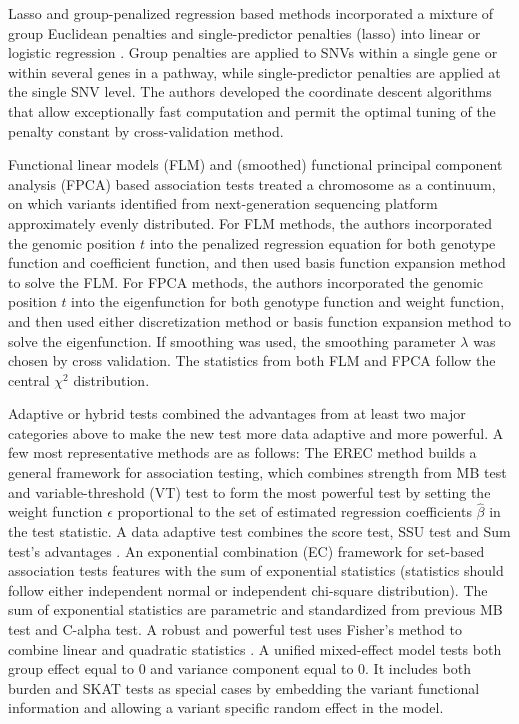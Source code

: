 \documentclass[12pt]{article}
\begin{document}
Lasso and group-penalized regression based methods incorporated a mixture of group Euclidean penalties and single-predictor penalties (lasso) into linear or logistic regression \cite{Zhou2010,Kim2014}. Group penalties are applied to SNVs within a single gene or within several genes in a pathway, while single-predictor penalties are applied at the single SNV level. The authors developed the coordinate descent algorithms that allow exceptionally fast computation and
permit the optimal tuning of the penalty constant by cross-validation method.

Functional linear models (FLM) and (smoothed) functional principal component analysis (FPCA) based association tests \cite{Luo2011,Luo2012, Luo2012a,Fan2013} treated a chromosome as a continuum, on which variants identified from next-generation sequencing platform approximately evenly distributed. For FLM methods, the authors incorporated the genomic position $t$ into the penalized regression equation for both genotype function and coefficient function, and then used basis function expansion method to solve the FLM. For FPCA methods, the authors incorporated the genomic position $t$ into the eigenfunction for both genotype function and weight function, and then used either discretization method or basis function expansion method to solve the eigenfunction. If smoothing was used, the smoothing parameter $\lambda$ was chosen by cross validation. The statistics from both FLM and FPCA follow the central $\chi^2$ distribution.

Adaptive or hybrid tests combined the advantages from at least two major categories above to make the new test more data adaptive and more powerful. A few most representative methods are as follows: The EREC method \cite{Lin2011} builds a general framework for association testing, which combines strength from MB test and variable-threshold (VT) test \cite{Price2010} to form the most powerful test by setting the weight function $\epsilon$ proportional to the set of estimated regression coefficients $\hat{\beta}$ in the test statistic. A data adaptive test combines the score test, SSU test and Sum test's advantages \cite{Pan2011}. An exponential combination (EC) framework for set-based association tests \cite{Chen2012} features with the sum of exponential statistics (statistics should follow either independent normal or independent chi-square distribution). The sum of exponential statistics are parametric and standardized from previous MB test and C-alpha test. A robust and powerful test uses Fisher's method to combine linear and quadratic statistics \cite{Derkach2013}. A unified mixed-effect model \cite{Sun2013} tests both group effect equal to 0 and variance component equal to 0. It includes both burden and SKAT tests as special cases by embedding the variant functional information and allowing a variant specific random effect in the model.
\end{document}
